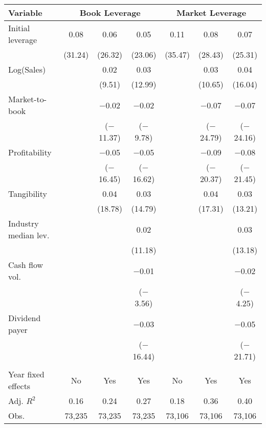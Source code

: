 \begin{tabular}{l*{6}{c}}
\toprule
Variable & \multicolumn{3}{c}{Book Leverage} & \multicolumn{3}{c}{Market Leverage} \\ \midrule
Initial leverage&        0.08&        0.06&        0.05&        0.11&        0.08&        0.07\\
            &     (31.24)&     (26.32)&     (23.06)&     (35.47)&     (28.43)&     (25.31)\\
\addlinespace
Log(Sales)  &            &        0.02&        0.03&            &        0.03&        0.04\\
            &            &      (9.51)&     (12.99)&            &     (10.65)&     (16.04)\\
\addlinespace
Market-to-book&            &     $-$0.02&     $-$0.02&            &     $-$0.07&     $-$0.07\\
            &            &  ($-$11.37)&   ($-$9.78)&            &  ($-$24.79)&  ($-$24.16)\\
\addlinespace
Profitability&            &     $-$0.05&     $-$0.05&            &     $-$0.09&     $-$0.08\\
            &            &  ($-$16.45)&  ($-$16.62)&            &  ($-$20.37)&  ($-$21.45)\\
\addlinespace
Tangibility &            &        0.04&        0.03&            &        0.04&        0.03\\
            &            &     (18.78)&     (14.79)&            &     (17.31)&     (13.21)\\
\addlinespace
Industry median lev.&            &            &        0.02&            &            &        0.03\\
            &            &            &     (11.18)&            &            &     (13.18)\\
\addlinespace
Cash flow vol.&            &            &     $-$0.01&            &            &     $-$0.02\\
            &            &            &   ($-$3.56)&            &            &   ($-$4.25)\\
\addlinespace
Dividend payer&            &            &     $-$0.03&            &            &     $-$0.05\\
            &            &            &  ($-$16.44)&            &            &  ($-$21.71)\\
\\
Year fixed effects&          No&         Yes&         Yes&          No&         Yes&         Yes\\
Adj. $ R^2$ &        0.16&        0.24&        0.27&        0.18&        0.36&        0.40\\
Obs.        &      73,235&      73,235&      73,235&      73,106&      73,106&      73,106\\
\bottomrule
\end{tabular}
